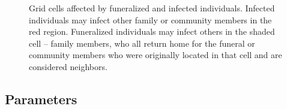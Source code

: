 \begin{figure}[h!]
\begin{center}
\end{center}
\caption{Grid cells affected by funeralized and infected individuals. Infected individuals may infect other family or community members in the red region. Funeralized individuals may infect others in the shaded cell -- family members, who all return home for the funeral or community members who were originally located in that cell and are considered neighbors.}
\label{fig:infect}
\end{figure}

\subsection{Parameters}

